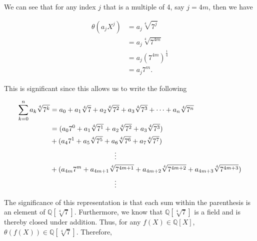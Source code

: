 \documentclass[12pt, a4paper]{article}
\begin{document}
\vspace{6mm}

We can see that for any index $j$ that is a multiple of 4, say $j=4m$, then we have

     \begin{equation*}
        \begin{split}
            \theta(a_j X^j) &= a_j\sqrt[4]{7^j} \\
            &= a_j\sqrt[4]{7^{4m}} \\
            &= a_j(7^{4m})^{\frac{1}{4}} \\
            &= a_j 7^m.
        \end{split}
    \end{equation*}
    
\vspace{6mm}

This is significant since this allows us to write the following

\newpage

     \begin{equation*}
        \begin{split}
            \sum\limits_{k=0}^{n} a_k\sqrt[4]{7^k} &= a_0 + a_1\sqrt[4]{7}+a_2\sqrt[4]{7^2}+a_3\sqrt[4]{7^3}+\cdots+a_n\sqrt[4]{7^n} \\
            &= (a_0 7^0+a_1\sqrt[4]{7^1}+a_2\sqrt[4]{7^2}+a_3\sqrt[4]{7^3}) \\
            &+ (a_4 7^1+a_5\sqrt[4]{7^5}+a_6\sqrt[4]{7^6}+a_7\sqrt[4]{7^7}) \\
            &\hspace{32.5mm}\vdots \\
            &+ (a_{4m} 7^m+a_{4m+1}\sqrt[4]{7^{4m+1}}+a_{4m+2}\sqrt[4]{7^{4m+2}}+a_{4m+3}\sqrt[4]{7^{4m+3}}) \\
            &\hspace{32.5mm}\vdots 
        \end{split}
    \end{equation*}
    
\vspace{6mm}

The significance of this representation is that each sum within the parenthesis is an element of $\mathbb{Q}[\sqrt[4]{7}]$. Furthermore, we know that $\mathbb{Q}[\sqrt[4]{7}]$ is a field and is thereby closed under addition. Thus, for any $f(X)\in\mathbb{Q}[X]$, $\theta(f(X))\in\mathbb{Q}[\sqrt[4]{7}]$. Therefore,

\vspace{6mm}
\end{document}
